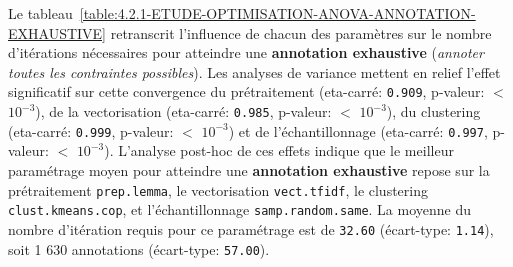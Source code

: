 				
				Le tableau~\ref{table:4.2.1-ETUDE-OPTIMISATION-ANOVA-ANNOTATION-EXHAUSTIVE} retranscrit l'influence de chacun des paramètres sur le nombre d'itérations nécessaires pour atteindre une \textbf{annotation exhaustive} (\textit{annoter toutes les contraintes possibles}).
				Les analyses de variance mettent en relief l'effet significatif sur cette convergence du prétraitement (eta-carré: \texttt{0.909}, p-valeur: \(<\) \texttt{\(10^{-3}\)}), de la vectorisation (eta-carré: \texttt{0.985}, p-valeur: \(<\) \texttt{\(10^{-3}\)}), du clustering (eta-carré: \texttt{0.999}, p-valeur: \(<\) \texttt{\(10^{-3}\)}) et de l'échantillonnage (eta-carré: \texttt{0.997}, p-valeur: \(<\) \texttt{\(10^{-3}\)}).
				L'analyse post-hoc de ces effets indique que le meilleur paramétrage moyen pour atteindre une \textbf{annotation exhaustive} repose sur la prétraitement \texttt{prep.lemma}, le vectorisation \texttt{vect.tfidf}, le clustering \texttt{clust.kmeans.cop}, et l'échantillonnage \texttt{samp.random.same}. La moyenne du nombre d'itération requis pour ce paramétrage est de \texttt{32.60} (écart-type: \texttt{1.14}), soit 1 630 annotations (écart-type: \texttt{57.00}).
